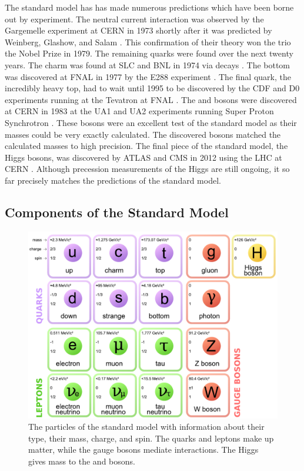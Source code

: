The standard model has has made numerous predictions which have been borne out
by experiment. The neutral current interaction was observed by the Gargemelle
experiment at CERN in 1973 shortly after it was predicted by Weinberg, Glashow,
and Salam \cite{hasert1973}. This confirmation of their theory won the trio the
Nobel Prize in 1979. The remaining quarks were found over the next twenty
years. The charm was found at SLC and BNL in 1974 via \jpsi decays
\cite{aubert1974}\cite{augustin1974}. The bottom was discovered at FNAL in 1977
by the E288 experiment \cite{herb1977}. The final quark, the incredibly heavy
top, had to wait until 1995 to be discovered by the CDF and D0 experiments
running at the Tevatron at FNAL \cite{cdf1995}\cite{d01995}. The \W and \Z
bosons were discovered at CERN in 1983 at the UA1 and UA2 experiments running
Super Proton Synchrotron \cite{ua1_w}\cite{ua2_w}\cite{ua1_z}\cite{ua2_z}.
These bosons were an excellent test of the standard model as their masses could
be very exactly calculated. The discovered bosons matched the calculated masses
to high precision. The final piece of the standard model, the Higgs bosons, was
discovered by ATLAS and CMS in 2012 using the LHC at CERN
\cite{atlas_higgs}\cite{cms_higgs}. Although precession measurements of the
Higgs are still ongoing, it so far precisely matches the predictions of the
standard model.

\subsection{Components of the Standard Model}

\begin{figure}[!htbp]
    \centering
    \includegraphics[width=\textwidth]{figures/standard_model.pdf}
    \caption[
        The particles of the standard model.
    ]{
        The particles of the standard model with information about their
        type, their mass, charge, and spin. The quarks and leptons make up
        matter, while the gauge bosons mediate interactions. The Higgs gives
        mass to the \W and \Z bosons.
    }
    \label{fig:standard_model}
\end{figure}

